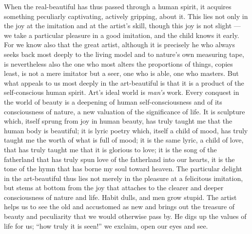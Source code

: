 \documentclass[12pt,a4paper,openany]{book}
\newcommand{\opage}[1]{\marginnote{\footnotesize\textit{[#1]}}}
\begin{document}
When the real-beautiful has thus passed through a human
spirit, it acquires something peculiarly captivating, actively gripping,
about it. This lies not only in the joy at the imitation
and at the artist's skill, though this joy is not
slight --- we take a particular pleasure in a good imitation,
and the child knows it early. For we know also that the great
artist, although it is precisely he who always seeks back most deeply to the
living model and to nature's own measuring tape, is nevertheless also
the one who most alters the proportions of things, copies least,
is not a mere imitator but a seer, one who is able, one who masters.
But what appeals to us most deeply in the art-beautiful is
that it is a product of the self-conscious human spirit. Art's
ideal world is \emph{man's} work. Every conquest
in the world of beauty is a deepening of human
self-consciousness and of its consciousness of nature, a new
valuation of the significance of life. It is sculpture which, itself
sprung from joy in human beauty, has truly
\setcounter{footnote}{0}%
\opage{266}taught me that the human body is beautiful; it is
lyric poetry which, itself a child of mood, has truly taught me
the worth of what is full of mood; it is the same lyric, a child of love,
that has truly taught me that it is glorious to love;
it is the song of the fatherland that has truly spun love of the fatherland
into our hearts, it is the tone of the hymn that has
borne my soul toward heaven. The particular delight in the
art-beautiful thus lies not merely in the pleasure at a felicitous
imitation, but stems at bottom from the joy that
attaches to the clearer and deeper consciousness of nature
and life. Habit dulls, and men grow stupid. The artist
helps us to see the old and accustomed as new and
brings out the treasure of beauty and peculiarity that we
would otherwise pass by. He digs up the values of life for us;
``how truly it is seen!'' we exclaim, open our eyes and see.
\end{document}
